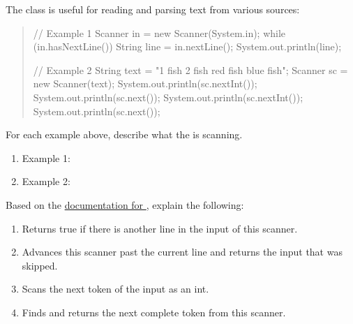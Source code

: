 
The  class is useful for reading and parsing text from various sources:

\begin{quote}
\begin{javalst}
// Example 1
Scanner in = new Scanner(System.in);
while (in.hasNextLine()) {
    String line = in.nextLine();
    System.out.println(line);
}

// Example 2
String text = "1 fish 2 fish red fish blue fish";
Scanner sc = new Scanner(text);
System.out.println(sc.nextInt());
System.out.println(sc.next());
System.out.println(sc.nextInt());
System.out.println(sc.next());
\end{javalst}
\end{quote}




\Q For each example above, describe what the  is scanning.

\begin{enumerate}
\item Example 1:~  
\item Example 2:~  
\end{enumerate}


\Q Based on the \href{https://docs.oracle.com/en/java/javase/11/docs/api/java.base/java/util/Scanner.html}{documentation for }, explain the following:

\begin{enumerate}
\item {} \vspace{-1ex}
\begin{answer}[1em]
Returns true if there is another line in the input of this scanner.
\end{answer}

\item {} \vspace{-1ex}
\begin{answer}[1em]
Advances this scanner past the current line and returns the input that was skipped.
\end{answer}

\item {} \vspace{-1ex}
\begin{answer}[1em]
Scans the next token of the input as an int.
\end{answer}

\item {} \vspace{-1ex}
\begin{answer}[1em]
Finds and returns the next complete token from this scanner.
\end{answer}
\end{enumerate}


